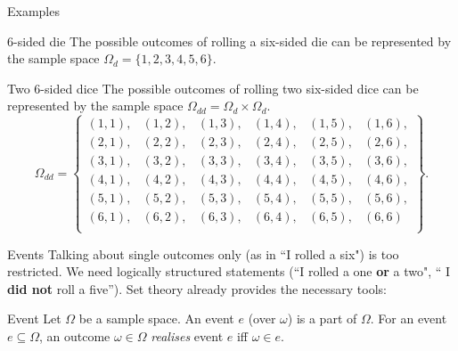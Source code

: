 \documentclass{beamer}
\begin{document}
\begin{frame}{Examples}
  \begin{exampleblock}{$6$-sided die}
    The possible outcomes of rolling a six-sided die can be represented by the sample space $\Omega_{d}= \{ 1, 2, 3, 4, 5, 6 \}$.
  \end{exampleblock}

  \begin{exampleblock}{Two $6$-sided dice}
    The possible outcomes of rolling two six-sided dice can be represented by the sample space $\Omega_{dd}= \Omega_{d}\times \Omega_{d}$.
    \[ \Omega_{dd} = \left\{ \begin{array}{llllll}
      (1, 1), &(1, 2), &(1, 3), &(1, 4), &(1, 5), &(1, 6),\\
      (2, 1), &(2, 2), &(2, 3), &(2, 4), &(2, 5), &(2, 6),\\
      (3, 1), &(3, 2), &(3, 3), &(3, 4), &(3, 5), &(3, 6),\\
      (4, 1), &(4, 2), &(4, 3), &(4, 4), &(4, 5), &(4, 6),\\
      (5, 1), &(5, 2), &(5, 3), &(5, 4), &(5, 5), &(5, 6),\\
      (6, 1), &(6, 2), &(6, 3), &(6, 4), &(6, 5), &(6, 6)\\
      \end{array}
      \right \}.\]
  \end{exampleblock}

\end{frame}

\begin{frame}{Events}
  Talking about single outcomes only (as in ``I rolled a six") is too restricted. We need logically structured statements (``I rolled a one {\bf or} a two", `` I \textbf{did not} roll a five''). Set theory already provides the necessary tools:

  \begin{block}{Event}
    Let $\Omega$ be a sample space. An event $e$ (over $\omega$) is a part of $\Omega$. For an event $e \subseteq \Omega$, an outcome $\omega \in \Omega$ \emph{realises} event $e$ iff $\omega \in e$.
  \end{block}
\end{frame}
\end{document}
